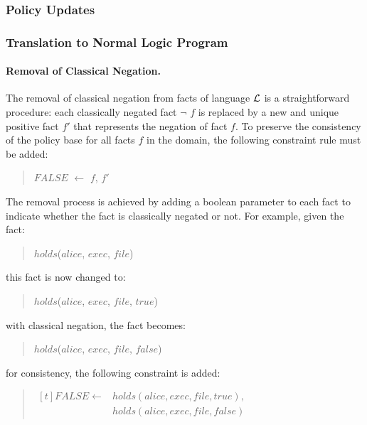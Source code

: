 \documentclass[10pt, twocolumn]{article}
\begin{document}
      \subsubsection{Policy Updates}

      \subsubsection{Translation to Normal Logic Program}

        \paragraph{Removal of Classical Negation.}

          The removal of classical negation from facts of language ${\cal L}$
          is a straightforward procedure: each classically negated fact
          $\lnot$ $f$ is replaced by a new and unique positive fact $f'$ that
          represents the negation of fact $f$. To preserve the consistency of
          the policy base for all facts $f$ in the domain, the following
          constraint rule must be added:

          \begin{quote}
            $FALSE$ $\leftarrow$ $f$, $f'$
          \end{quote}

          The removal process is achieved by adding a boolean parameter to
          each fact to indicate whether the fact is classically negated or
          not. For example, given the fact:

          \begin{quote}
            $holds$($alice$, $exec$, $file$)
          \end{quote}

          this fact is now changed to:

          \begin{quote}
            $holds$($alice$, $exec$, $file$, $true$)
          \end{quote}

          with classical negation, the fact becomes:

          \begin{quote}
            $holds$($alice$, $exec$, $file$, $false$)
          \end{quote}

          for consistency, the following constraint is added:

          \begin{quote}
            \begin{math}
              \begin{aligned}[t]
                FALSE \leftarrow & holds(alice, exec, file, true), \\
                & holds(alice, exec, file, false)
              \end{aligned}
            \end{math}
          \end{quote}
\end{document}
